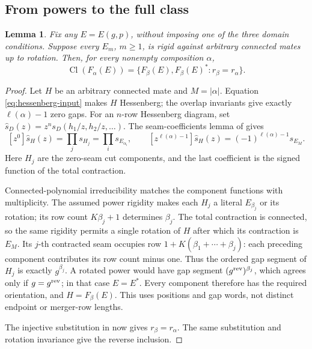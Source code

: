 \documentclass[11pt,a4paper]{amsart}
\numberwithin{equation}{section}
\theoremstyle{plain}
\newtheorem{lemma}[theorem]{Lemma}
\theoremstyle{definition}
\begin{document}
\subsection{From powers to the full class}\label{subsec:exposure}

\begin{lemma}\label{lem:class-exposure}
Fix any \(E=E(g,p)\), without imposing one of the three domain
conditions.  Suppose every \(E_m\), \(m\ge1\), is rigid against
arbitrary connected mates up to rotation.  Then, for every nonempty
composition \(\alpha\),
\[
 \operatorname{Cl}(F_\alpha(E))
 =\{F_\beta(E),F_\beta(E)^*:r_\beta=r_\alpha\}.
\]
\end{lemma}

\begin{proof}
Let \(H\) be an arbitrary connected mate and \(M=|\alpha|\).
Equation \eqref{eq:hessenberg-input} makes \(H\) Hessenberg;
the overlap invariants give exactly \(\ell(\alpha)-1\) zero gaps.
For an \(n\)-row Hessenberg diagram, set
\(\widehat s_D(z)=z^n s_D(h_1/z,h_2/z,\ldots)\).
The seam-coefficients lemma of \cite{Shields2026Inflation} gives
\begin{equation}\label{eq:cut-contract}
 [z^0]\widehat s_H(z)=\prod_j s_{H_j}
                  =\prod_i s_{E_{\alpha_i}},\qquad
 [z^{\ell(\alpha)-1}]\widehat s_H(z)
                  =(-1)^{\ell(\alpha)-1}s_{E_M}.
\end{equation}
Here \(H_j\) are the zero-seam cut components, and the last
coefficient is the signed function of the total contraction.

Connected-polynomial irreducibility
\cite{Barekat2009CoincidencesCorrigendum} matches the component
functions with multiplicity.  The assumed power rigidity makes each
\(H_j\) a literal \(E_{\beta_j}\) or its rotation;
its row count \(K\beta_j+1\) determines \(\beta_j\).
The total contraction is connected, so the same rigidity permits a
single rotation of \(H\) after which its contraction is \(E_M\).
Its \(j\)-th contracted seam occupies row
\(1+K(\beta_1+\cdots+\beta_j)\): each preceding component
contributes its row count minus one.  Thus the ordered gap segment of
\(H_j\) is exactly \(g^{\beta_j}\).  A rotated power would
have gap segment \((g^{\rm rev})^{\beta_j}\), which agrees
only if \(g=g^{\rm rev}\); in that case \(E=E^*\).
Every component therefore has the required orientation, and
\(H=F_\beta(E)\).  This uses positions and gap words, not distinct
endpoint or merger-row lengths.

The injective substitution in  now gives
\(r_\beta=r_\alpha\).  The same substitution and rotation
invariance give the reverse inclusion.
\end{proof}
\end{document}
